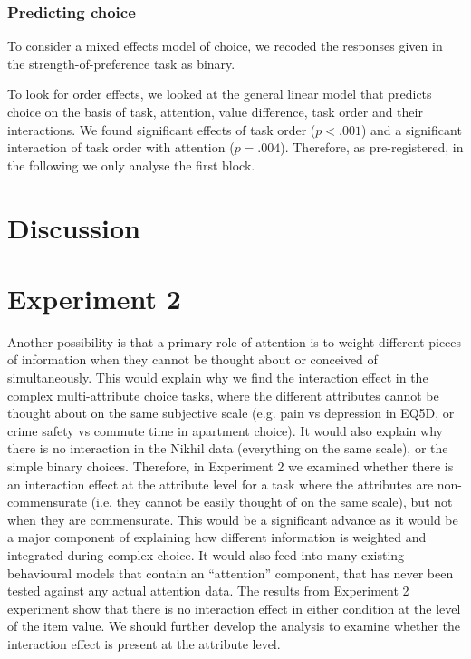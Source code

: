 \documentclass[doc, a4paper, apacite]{apa6}
\begin{document}
\subsubsection{Predicting choice}
To consider a mixed effects model of choice, we recoded the responses given in the strength-of-preference task as binary.

To look for order effects, we looked at the general linear model that predicts choice on the basis of task, attention, value difference, task order and their interactions. We found significant effects of task order ($p<.001$) and a significant interaction of task order with attention ($p=.004$). Therefore, as pre-registered, in the following we only analyse the first block. 



\section{Discussion}


\section{Experiment 2} \label{exp:NS07}
Another possibility is that a primary role of attention is to weight different pieces of information when they cannot be thought about or conceived of simultaneously. 
This would explain why we find the interaction effect in the complex multi-attribute choice tasks, where the different attributes cannot be thought about on the same subjective scale (e.g. pain vs depression in EQ5D, or crime safety vs commute time in apartment choice). 
It would also explain why there is no interaction in the Nikhil data (everything on the same scale), or the simple binary choices. 
Therefore, in Experiment 2 we examined whether there is an interaction effect at the attribute level for a task where the attributes are non-commensurate (i.e. they cannot be easily thought of on the same scale), but not when they are commensurate. 
This would be a significant advance as it would be a major component of explaining how different information is weighted and integrated during complex choice. 
It would also feed into many existing behavioural models that contain an “attention” component, that has never been tested against any actual attention data. 
The results from Experiment 2 experiment show that there is no interaction effect in either condition at the level of the item value. 
We should further develop the analysis to examine whether the interaction effect is present at the attribute level.
	
\end{document}
